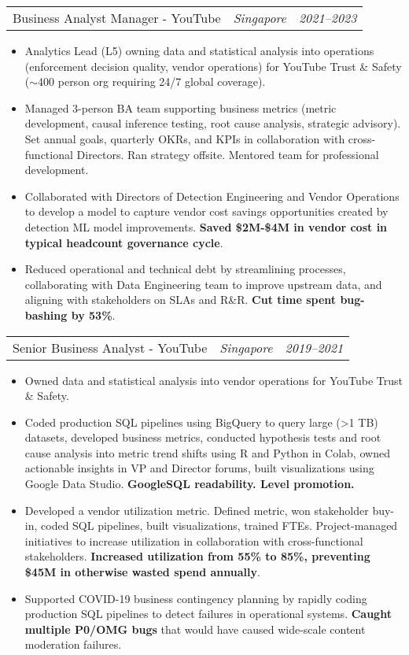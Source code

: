 \documentclass[letterpaper,11pt]{article}
\makeatletter
\newcommand{\resumeItem}[1]{
  \item\small{
    {#1}
  }
}
\newcommand{\resumePosition}[3]{
  \item
    \begin{tabular*}{0.96\textwidth}[t]{p{9cm}p{6cm}@{\extracolsep{\fill}}r}
      #1 & \textit{#2} & \textit{#3} \\
    \end{tabular*}
}
\newcommand{\resumeItemListStart}{\begin{itemize}[label=-]}
\newcommand{\resumeItemListEnd}{\end{itemize}}
\makeatother
\begin{document}
          \resumePosition{Business Analyst Manager - YouTube}{Singapore}{2021–2023}
            \resumeItemListStart
              \resumeItem{Analytics Lead (L5) owning data and statistical analysis into operations (enforcement decision quality, vendor operations) for YouTube Trust \& Safety ($\sim$400 person org requiring 24/7 global coverage).}
              \resumeItem{Managed 3-person BA team supporting business metrics (metric development, causal inference testing, root cause analysis, strategic advisory). Set annual goals, quarterly OKRs, and KPIs in collaboration with cross-functional Directors. Ran strategy offsite. Mentored team for professional development.}
              \resumeItem{Collaborated with Directors of Detection Engineering and Vendor Operations to develop a model to capture vendor cost savings opportunities created by detection ML model improvements. \textbf{Saved \$2M-\$4M in vendor cost in typical headcount governance cycle}.}
              \resumeItem{Reduced operational and technical debt by streamlining processes, collaborating with Data Engineering team to improve upstream data, and aligning with stakeholders on SLAs and R\&R. \textbf{Cut time spent bug-bashing by 53\%}.}
            \resumeItemListEnd
    
          \resumePosition{Senior Business Analyst - YouTube}{Singapore}{2019–2021}
            \resumeItemListStart
              \resumeItem{Owned data and statistical analysis into vendor operations for YouTube Trust \& Safety.}
              \resumeItem{Coded production SQL pipelines using BigQuery to query large (\textgreater 1 TB) datasets, developed business metrics, conducted hypothesis tests and root cause analysis into metric trend shifts using R and Python in Colab, owned actionable insights in VP and Director forums, built visualizations using Google Data Studio. \textbf{GoogleSQL readability. Level promotion.}}
              \resumeItem{Developed a vendor utilization metric. Defined metric, won stakeholder buy-in, coded SQL pipelines, built visualizations, trained FTEs. Project-managed initiatives to increase utilization in collaboration with cross-functional stakeholders. \textbf{Increased utilization from 55\% to 85\%, preventing \$45M in otherwise wasted spend annually}.}
              \resumeItem{Supported COVID-19 business contingency planning by rapidly coding production SQL pipelines to detect failures in operational systems. \textbf{Caught multiple P0/OMG bugs} that would have caused wide-scale content moderation failures.}
            \resumeItemListEnd
        
\end{document}
